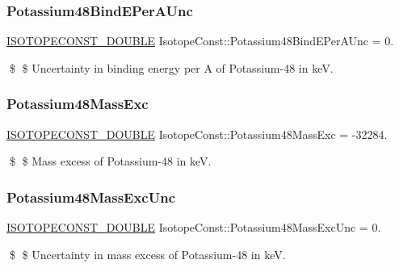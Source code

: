 \subsubsection{\texorpdfstring{Potassium48\+Bind\+E\+Per\+A\+Unc}{Potassium48BindEPerAUnc}}
{\footnotesize\ttfamily \mbox{\hyperlink{group___isotope_const-_macros_ga8f45a7272ce02c0b4c65c44636ed719a}{I\+S\+O\+T\+O\+P\+E\+C\+O\+N\+S\+T\+\_\+\+D\+O\+U\+B\+LE}} Isotope\+Const\+::\+Potassium48\+Bind\+E\+Per\+A\+Unc = 0.}

\$ \$ Uncertainty in binding energy per A of Potassium-\/48 in keV. \mbox{\label{group___isotope_const-_potassium-_k48_ga8471cd37f40cf3398f479ae77cc5aa6c}} 
\subsubsection{\texorpdfstring{Potassium48\+Mass\+Exc}{Potassium48MassExc}}
{\footnotesize\ttfamily \mbox{\hyperlink{group___isotope_const-_macros_ga8f45a7272ce02c0b4c65c44636ed719a}{I\+S\+O\+T\+O\+P\+E\+C\+O\+N\+S\+T\+\_\+\+D\+O\+U\+B\+LE}} Isotope\+Const\+::\+Potassium48\+Mass\+Exc = -\/32284.}

\$ \$ Mass excess of Potassium-\/48 in keV. \mbox{\label{group___isotope_const-_potassium-_k48_ga9723a2e17e8de263d039ae26576257d1}} 
\subsubsection{\texorpdfstring{Potassium48\+Mass\+Exc\+Unc}{Potassium48MassExcUnc}}
{\footnotesize\ttfamily \mbox{\hyperlink{group___isotope_const-_macros_ga8f45a7272ce02c0b4c65c44636ed719a}{I\+S\+O\+T\+O\+P\+E\+C\+O\+N\+S\+T\+\_\+\+D\+O\+U\+B\+LE}} Isotope\+Const\+::\+Potassium48\+Mass\+Exc\+Unc = 0.}

\$ \$ Uncertainty in mass excess of Potassium-\/48 in keV. \mbox{\label{group___isotope_const-_potassium-_k48_gaa73e0d4055a4562202efaa11f4b89c4d}} 
